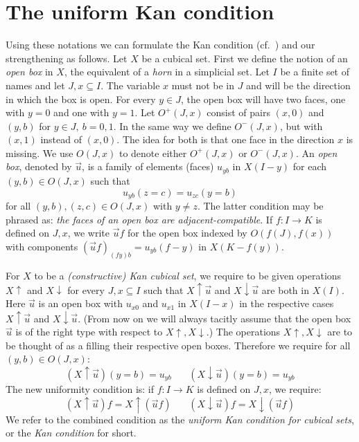 \documentclass[a4paper,USenglish,draft]{lipics}
\newcommand{\rup}[1]{#1{\uparrow}}
\newcommand{\rdo}[1]{#1{\downarrow}}
\begin{document}
\section{The uniform Kan condition}

Using these notations we can formulate the Kan condition (cf.\
\cite{Kan}) and our strengthening as follows. Let $X$ be a cubical
set.  First we define the notion of an \emph{open box} in $X$, the
equivalent of a \emph{horn} in a simplicial set.  Let $I$ be a finite
set of names and let $J,x \subseteq I$.  The variable $x$ must not be
in $J$ and will be the direction in which the box is open.  For every
$y\in J$, the open box will have two faces, one with $y=0$ and one
with $y=1$.  Let $O^+(J,x)$ consist of pairs $(x,0)$ and $(y,b)$ for
$y\in J,~b=0,1$.  In the same way we define $O^-(J,x)$, but with
$(x,1)$ instead of $(x,0)$.  The idea for both is that one face in the
direction $x$ is missing.  We use $O(J,x)$ to denote either $O^+(J,x)$
or $O^-(J,x)$.  An \emph{open box}, denoted by $\vec u$, is a family
of elements (faces) $u_{yb}$ in $X(I-y)$ for each $(y,b)\in O(J,x)$
such that
\[
u_{yb}(z = c) = u_{zc}(y = b)
\]
for all $(y,b),(z,c)\in O(J,x)$ with $y\neq z$.  The latter condition
may be phrased as: \emph{the faces of an open box are
  adjacent-compatible}.  If $f:I\to K$ is defined on $J,x$, we write
$\vec u f$ for the open box indexed by $O (f (J), f(x))$ with
components $(\vec u f)_{(f y)b} = u_{yb} (f-y)$ in $X (K - f(y))$.

For $X$ to be a \emph{(constructive) Kan cubical set}, we require to
be given operations $\rup{X}$ and $\rdo{X}$ for every $J,x\subseteq I$
such that $\rup{X} \vec u$ and $\rdo{X} \vec u$ are both in $X(I)$.
Here $\vec u$ is an open box with $u_{x0}$ and $u_{x1}$ in $X(I-x)$ in
the respective cases $\rup{X} \vec u$ and $\rdo{X} \vec u$. (From now
on we will always tacitly assume that the open box $\vec u$ is of the
right type with respect to $\rup{X},\rdo{X}$.)  The operations
$\rup{X},\rdo{X}$ are to be thought of as a filling their respective
open boxes. Therefore we require for all $(y,b)\in O(J,x)$:
$$
(\rup{X} \vec u) (y=b) = u_{yb}~~~~~~~~(\rdo{X} \vec u) (y=b) = u_{yb}
$$
The new uniformity condition is: if $f:I\to K$ is defined on $J,x$, we
require:
$$
(\rup{X} \vec u) f = \rup{X} (\vec{u}f)~~~~~~~~(\rdo{X} \vec u) f = \rdo{X} (\vec{u}f)
$$
We refer to the combined condition as the \emph{uniform Kan condition
  for cubical sets}, or the \emph{Kan condition} for
short. %
\end{document}
